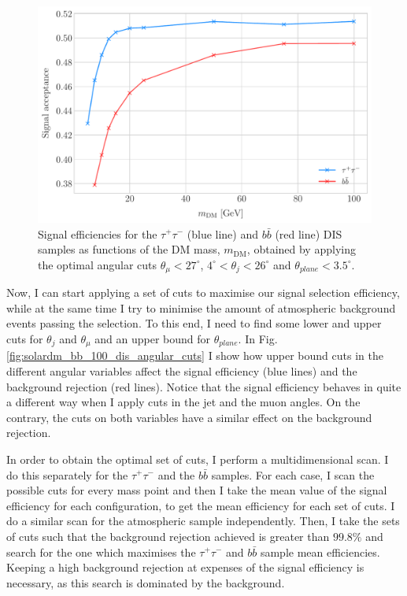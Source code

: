 \begin{figure}[t]
	\centering
	\includegraphics[width=0.9\linewidth]{Images/DM_Analysis/solardm_dis_signal_acceptance.pdf}
	\caption[Signal efficiencies for the $\tau^{+} \tau^{-}$ and $b\bar{b}$ DIS samples as functions of the DM mass.]{Signal efficiencies for the $\tau^{+} \tau^{-}$ (blue line) and $b\bar{b}$ (red line) DIS samples as functions of the DM mass, $m_{\mathrm{DM}}$, obtained by applying the optimal angular cuts $\theta_{\mu} < 27^{\circ}$, $4^{\circ} < \theta_{j} < 26^{\circ}$ and $\theta_{plane} < 3.5^{\circ}$.}
	\label{fig:solardm_dis_efficiency}
\end{figure}

Now, I can start applying a set of cuts to maximise our signal selection efficiency, while at the same time I try to minimise the amount of atmospheric background events passing the selection. To this end, I need to find some lower and upper cuts for $\theta_{j}$ and $\theta_{\mu}$ and an upper bound for $\theta_{plane}$. In Fig. \ref{fig:solardm_bb_100_dis_angular_cuts} I show how upper bound cuts in the different angular variables affect the signal efficiency (blue lines) and the background rejection (red lines). Notice that the signal efficiency behaves in quite a different way when I apply cuts in the jet and the muon angles. On the contrary, the cuts on both variables have a similar effect on the background rejection.

In order to obtain the optimal set of cuts, I perform a multidimensional scan. I do this separately for the $\tau^{+} \tau^{-}$ and the $b\bar{b}$ samples. For each case, I scan the possible cuts for every mass point and then I take the mean value of the signal efficiency for each configuration, to get the mean efficiency for each set of cuts. I do a similar scan for the atmospheric sample independently. Then, I take the sets of cuts such that the background rejection achieved is greater than $99.8\%$ and search for the one which maximises the $\tau^{+} \tau^{-}$ and $b\bar{b}$ sample mean efficiencies. Keeping a high background rejection at expenses of the signal efficiency is necessary, as this search is dominated by the background.


